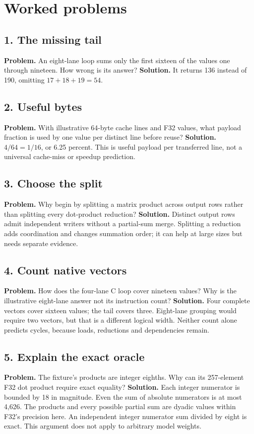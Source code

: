\section{Worked problems}
\subsection*{1. The missing tail}
\textbf{Problem.} An eight-lane loop sums only the first sixteen of the
values one through nineteen. How wrong is its answer?
\textbf{Solution.} It returns 136 instead of 190, omitting $17+18+19=54$.
\subsection*{2. Useful bytes}
\textbf{Problem.} With illustrative 64-byte cache lines and F32 values,
what payload fraction is used by one value per distinct line before reuse?
\textbf{Solution.} $4/64=1/16$, or 6.25 percent. This is useful payload
per transferred line, not a universal cache-miss or speedup prediction.
\subsection*{3. Choose the split}
\textbf{Problem.} Why begin by splitting a matrix product across output
rows rather than splitting every dot-product reduction?
\textbf{Solution.} Distinct output rows admit independent writers without
a partial-sum merge. Splitting a reduction adds coordination and changes
summation order; it can help at large sizes but needs separate evidence.
\subsection*{4. Count native vectors}
\textbf{Problem.} How does the four-lane C loop cover nineteen values?
Why is the illustrative eight-lane answer not its instruction count?
\textbf{Solution.} Four complete vectors cover sixteen values; the
tail covers three. Eight-lane grouping would require two vectors,
but that is a different logical width. Neither count alone predicts
cycles, because loads, reductions and dependencies remain.
\subsection*{5. Explain the exact oracle}
\textbf{Problem.} The fixture's products are integer eighths.
Why can its 257-element F32 dot product require exact equality?
\textbf{Solution.} Each integer numerator is bounded by 18 in magnitude.
Even the sum of absolute numerators is at most 4,626. The products
and every possible partial sum are dyadic values within F32's
precision here. An independent integer numerator sum divided by
eight is exact. This argument does not apply to arbitrary model weights.
